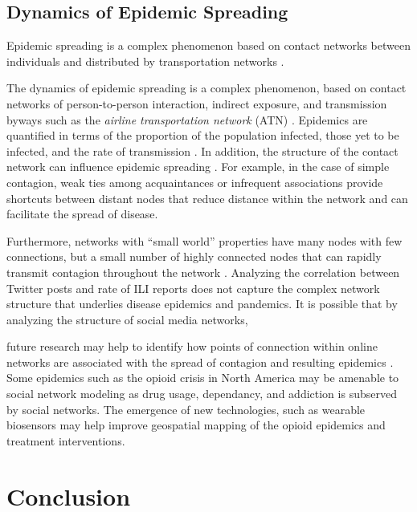 \documentclass[sigconf]{acmart}
\begin{document}
\subsection{Dynamics of Epidemic Spreading}

Epidemic spreading is a complex phenomenon based on contact networks between 
individuals and distributed by transportation networks \cite{Colizza06}.

The dynamics of epidemic spreading is a complex phenomenon, based on contact 
networks of person-to-person interaction, indirect exposure, and transmission 
byways such as the {\it airline transportation network} (ATN) \cite{Colizza06}. 
Epidemics are quantified in terms of the proportion of the population infected, 
those yet to be infected, and the rate of transmission \cite{hethcote00}. In 
addition, the structure of the contact network can influence epidemic spreading 
\cite{pastor01}. For example, in the case of simple contagion, weak ties among 
acquaintances or infrequent associations provide shortcuts between distant nodes 
that reduce distance within the network \cite{granovetter73} and can facilitate 
the spread of disease. 

Furthermore, networks with ``small world'' properties have many nodes with 
few connections, but a small number of highly connected nodes that can rapidly 
transmit contagion throughout the network \cite{watts98}. Analyzing the 
correlation between Twitter posts and rate of ILI reports does not capture the 
complex network structure that underlies disease epidemics and pandemics. 
It is possible that by analyzing the structure of social media networks, 

future research may help to identify how points of connection within online
networks are associated with the spread of contagion and resulting epidemics 
\cite{zhu17}. Some epidemics such as the opioid crisis in North America 
\cite{volkow14} may be amenable to social network modeling as drug usage, 
dependancy, and addiction is subserved by social networks. The emergence of 
new technologies, such as wearable biosensors \cite{carreiro15} may help 
improve geospatial mapping of the opioid epidemics and treatment interventions.

\section{Conclusion}
\end{document}
